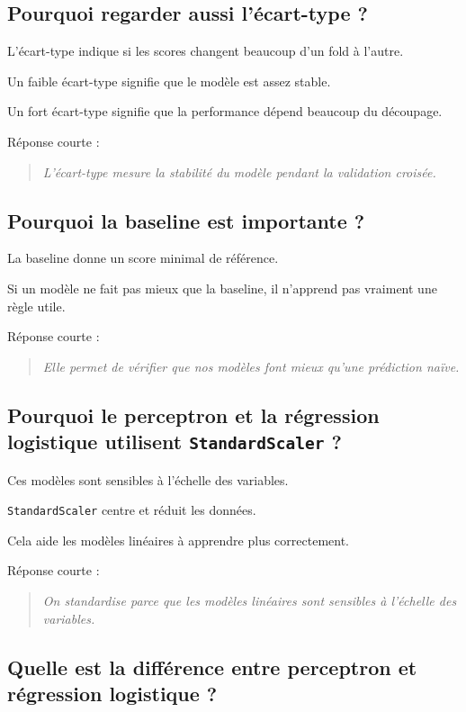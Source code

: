 \documentclass[11pt,a4paper]{article}
\begin{document}
\subsection{Pourquoi regarder aussi l'écart-type ?}

L'écart-type indique si les scores changent beaucoup d'un fold à l'autre.

Un faible écart-type signifie que le modèle est assez stable.

Un fort écart-type signifie que la performance dépend beaucoup du découpage.

Réponse courte :

\begin{quote}
\itshape L'écart-type mesure la stabilité du modèle pendant la validation croisée.
\end{quote}

\subsection{Pourquoi la baseline est importante ?}

La baseline donne un score minimal de référence.

Si un modèle ne fait pas mieux que la baseline, il n'apprend pas vraiment une règle utile.

Réponse courte :

\begin{quote}
\itshape Elle permet de vérifier que nos modèles font mieux qu'une prédiction naïve.
\end{quote}

\subsection{Pourquoi le perceptron et la régression logistique utilisent \texttt{StandardScaler} ?}

Ces modèles sont sensibles à l'échelle des variables.

\texttt{StandardScaler} centre et réduit les données.

Cela aide les modèles linéaires à apprendre plus correctement.

Réponse courte :

\begin{quote}
\itshape On standardise parce que les modèles linéaires sont sensibles à l'échelle des variables.
\end{quote}

\subsection{Quelle est la différence entre perceptron et régression logistique ?}
\end{document}
